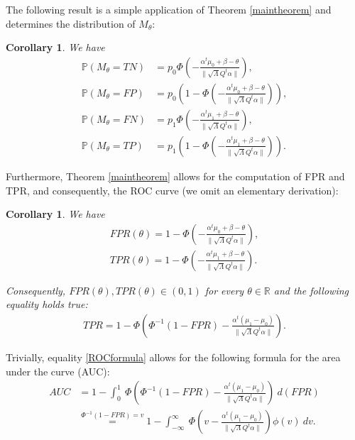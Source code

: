 \documentclass[10pt]{article}
\newtheorem{cor}[thm]{Corollary}
\newcommand{\reals}{\mathbb{R}}
\newcommand{\Prob}{\mathbb{P}}
\begin{document}
The following result is a simple application of Theorem \ref{maintheorem} and determines the distribution of $M_{\theta}$:
\begin{cor}
We have 
\begin{equation*}
\begin{split}
\Prob(M_{\theta} = TN) &= p_0 \Phi\left(-\frac{\alpha^t\mu_0 + \beta - \theta}{\|\sqrt{\Lambda}Q^t\alpha\|}\right),\\
\Prob(M_{\theta} = FP) &= p_0 \left(1 - \Phi\left(-\frac{\alpha^t\mu_0 + \beta - \theta}{\|\sqrt{\Lambda}Q^t\alpha\|}\right)\right),\\
\Prob(M_{\theta} = FN) &= p_1 \Phi\left(-\frac{\alpha^t\mu_1 + \beta - \theta}{\|\sqrt{\Lambda}Q^t\alpha\|}\right),\\
\Prob(M_{\theta} = TP) &= p_1 \left(1-\Phi\left(-\frac{\alpha^t\mu_1 + \beta - \theta}{\|\sqrt{\Lambda}Q^t\alpha\|}\right)\right).
\end{split}
\end{equation*}
\end{cor}

\noindent
Furthermore, Theorem \ref{maintheorem} allows for the computation of FPR and TPR, and consequently, the ROC curve (we omit an elementary derivation):
\begin{cor}
\noindent
We have
\begin{equation*}
\begin{split}
FPR(\theta) = 1 - \Phi\left(-\frac{\alpha^t\mu_0 + \beta - \theta}{\|\sqrt{\Lambda}Q^t\alpha\|}\right),\\
TPR(\theta) = 1-\Phi\left(-\frac{\alpha^t\mu_1 + \beta - \theta}{\|\sqrt{\Lambda}Q^t\alpha\|}\right).
\end{split}
\end{equation*}

\noindent
Consequently, $FPR(\theta), TPR(\theta) \in (0,1)$ for every $\theta\in\reals$ and the following equality holds true:
\begin{gather}
TPR = 1- \Phi\left(\Phi^{-1}(1-FPR) - \frac{\alpha^t(\mu_1 -\mu_0)}{\|\sqrt{\Lambda}Q^t\alpha\|}\right).
\label{ROCformula}
\end{gather}
\end{cor}

Trivially, equality \eqref{ROCformula} allows for the following formula for the area under the curve (AUC):
\begin{equation*}
\begin{split}
AUC &= 1 - \int_0^1\ \Phi\left(\Phi^{-1}(1-FPR) - \frac{\alpha^t(\mu_1 -\mu_0)}{\|\sqrt{\Lambda}Q^t\alpha\|}\right)\ d(FPR)\\
&\stackrel{\Phi^{-1}(1-FPR) = v}{=} 1 - \int_{-\infty}^{\infty}\ \Phi\left(v - \frac{\alpha^t(\mu_1 -\mu_0)}{\|\sqrt{\Lambda}Q^t\alpha\|}\right)\phi(v)\ dv.
\end{split}
\end{equation*}
\end{document}
